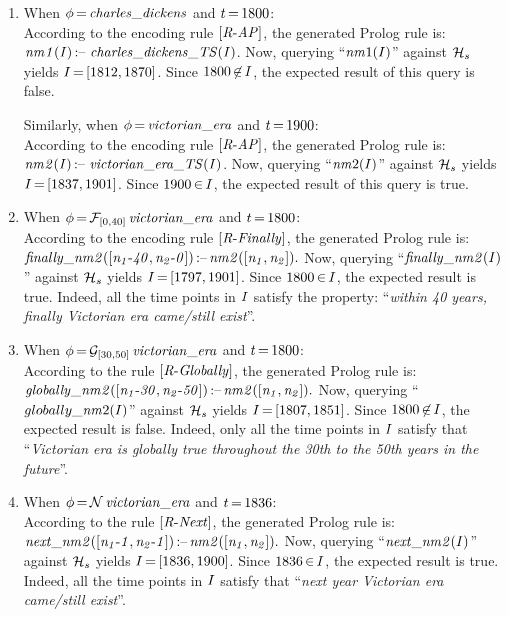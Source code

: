 \begin{enumerate}[itemsep=0.7em,leftmargin=!,wide]
\item 
When 
$\phi\,{=}\,\mathit{charles\_dickens}$ and $t\,{=}\,1800$: \\ 
According to the encoding rule $[\mathit{R}\text{-}\mathit{AP}]$, the generated Prolog rule is: $\mathit{\mathit{nm}1(I)}\,\text{:--}\,\,\mathit{
charles\_dickens\_TS(I)}$.
Now, querying ``$\mathit{nm}1(I)$'' against $\mathcal{H}_s$ yields $I\,{=}\,[1812, 1870]$. Since $1800\,{\not\in}\,I$, the expected result of this query is false.

Similarly, when 
$\phi\,{=}\,\mathit{victorian\_era}$ and $t\,{=}\,1900$: \\ 
According to the encoding rule $[\mathit{R}\text{-}\mathit{AP}]$, the generated Prolog rule is: $\mathit{\mathit{nm}2(I)}\,\text{:--}\,\,\mathit{
victorian\_era\_TS(I)}$.
Now, querying ``$\mathit{nm}2(I)$'' against $\mathcal{H}_s$ yields $I\,{=}\,[1837, 1901]$. Since $1900\,{\in}\,I$, the expected result of this query is true. 

\item When $\phi\,{=}\,\mathcal{F}_{[0, 40]}\,\mathit{victorian\_era}$ and $t\,{=}\,1800$: \\
According to the encoding rule $[\mathit{R}\text{-}\mathit{Finally}]$, the generated Prolog rule is: 
$\mathit{finally\_\mathit{nm}2([n_1\text{-}40, n_2\text{-}0])}\,\text{:--}\, \mathit{
\mathit{nm}2([n_1, n_2])}.$
Now, querying ``$\mathit{finally\_\mathit{nm}2}(I)$'' against $\mathcal{H}_s$ yields $I\,{=}\,[1797, 1901]$. Since $1800\,{\in}\,I$, the expected result is true. 
Indeed, all the time points in $I$ satisfy the property: ``\emph{within 40 years, finally Victorian era came/still exist}''. 

\item When $\phi\,{=}\,\mathcal{G}_{[30, 50]}\,\mathit{victorian\_era}$ and $t\,{=}\,1800$: \\
According to the rule $[\mathit{R}\text{-}\mathit{Globally}]$, the generated Prolog rule is: $\mathit{globally\_\mathit{nm}2([n_1\text{-}30, n_2\text{-}50])}\,\text{:--}\, \mathit{
\mathit{nm}2([n_1, n_2])}.$
Now, querying ``$globally\_\mathit{nm}2(I)$'' against $\mathcal{H}_s$ yields $I\,{=}\,[1807, 1851]$. Since $1800\,{\not\in}\,I$, the expected result is false. 
Indeed, only all the time points in $I$ satisfy that ``\emph{Victorian era is globally true throughout the 30th to the 50th years in the future}''. 

\item When $\phi\,{=}\,\mathcal{N}\,\mathit{victorian\_era}$ and $t\,{=}\,1836$: \\
According to the rule $[\mathit{R}\text{-}\mathit{Next}]$, the generated Prolog rule is: $\mathit{next\_\mathit{nm}2([n_1\text{-}1, n_2\text{-}1])}\,\text{:--}\, \mathit{
\mathit{nm}2([n_1, n_2])}.$
Now, querying ``$\mathit{next\_\mathit{nm}2}(I)$'' against $\mathcal{H}_s$ yields $I\,{=}\,[1836, 1900]$. Since  $1836\,{\in}\,I$, the expected result is true. 
Indeed, all the time points in $I$ satisfy that ``\emph{next year Victorian era came/still exist}''. 


\end{enumerate}
